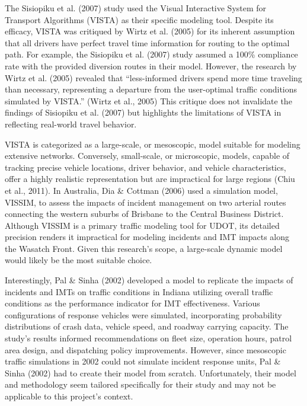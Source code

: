 \documentclass[fancy, oneside, mastersfancy, ms]{byuthesis}
\begin{document}
The Sisiopiku et al. (2007) study used the Visual Interactive System for
Transport Algorithms (VISTA) as their specific modeling tool. Despite
its efficacy, VISTA was critiqued by Wirtz et al. (2005) for its
inherent assumption that all drivers have perfect travel time
information for routing to the optimal path. For example, the Sisiopiku
et al. (2007) study assumed a 100\% compliance rate with the provided
diversion routes in their model. However, the research by Wirtz et al.
(2005) revealed that ``less-informed drivers spend more time traveling
than necessary, representing a departure from the user-optimal traffic
conditions simulated by VISTA.'' (Wirtz et al., 2005) This critique does
not invalidate the findings of Sisiopiku et al. (2007) but highlights
the limitations of VISTA in reflecting real-world travel behavior.

VISTA is categorized as a large-scale, or mesoscopic, model suitable for
modeling extensive networks. Conversely, small-scale, or microscopic,
models, capable of tracking precise vehicle locations, driver behavior,
and vehicle characteristics, offer a highly realistic representation but
are impractical for large regions (Chiu et al., 2011). In Australia, Dia
\& Cottman (2006) used a simulation model, VISSIM, to assess the impacts
of incident management on two arterial routes connecting the western
suburbs of Brisbane to the Central Business District. Although VISSIM is
a primary traffic modeling tool for UDOT, its detailed precision renders
it impractical for modeling incidents and IMT impacts along the Wasatch
Front. Given this research's scope, a large-scale dynamic model would
likely be the most suitable choice.

Interestingly, Pal \& Sinha (2002) developed a model to replicate the
impacts of incidents and IMTs on traffic conditions in Indiana utilizing
overall traffic conditions as the performance indicator for IMT
effectiveness. Various configurations of response vehicles were
simulated, incorporating probability distributions of crash data,
vehicle speed, and roadway carrying capacity. The study's results
informed recommendations on fleet size, operation hours, patrol area
design, and dispatching policy improvements. However, since mesoscopic
traffic simulations in 2002 could not simulate incident response units,
Pal \& Sinha (2002) had to create their model from scratch.
Unfortunately, their model and methodology seem tailored specifically
for their study and may not be applicable to this project's context.
\end{document}
